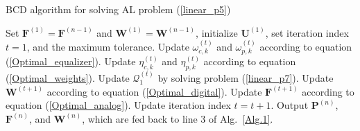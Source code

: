 \documentclass[10pt,journal,twocolumn]{IEEEtran}
\begin{document}
\begin{algorithm}[t]
	\caption{BCD algorithm for solving AL problem (\ref{linear_p5})}
	\begin{algorithmic}[1]\label{Alg.2}
		\STATE Set $\mathbf{F}^{(1)}=\mathbf{F}^{(n-1)}$ and $\mathbf{W}^{(1)}=\mathbf{W}^{(n-1)}$,  initialize $\mathbf{U}^{(1)}$, set iteration index $t=1$,  and the maximum tolerance.
		\STATE Update $\omega^{(t)}_{c,k}$ and $\omega^{(t)}_{p,k}$ according to equation (\ref{Optimal_equalizer}).
        \STATE Update $\eta^{(t)}_{c,k}$ and $\eta^{(t)}_{p,k}$ according to equation (\ref{Optimal_weights}).
        \STATE Update $\mathcal{Q}^{(t)}_1$ by solving problem (\ref{linear_p7}).
        \STATE Update $\mathbf{W}^{(t+1)}$ according to equation (\ref{Optimal_digital}).
        \STATE Update $\mathbf{F}^{(t+1)}$ according to equation (\ref{Optimal_analog}).
		\STATE Update iteration index $t=t+1$.
		\ENDWHILE	
		\STATE Output $\mathbf{P}^{(n)}$, $\mathbf{F}^{(n)}$, and $\mathbf{W}^{(n)}$, which are fed back to line 3 of Alg.~\ref{Alg.1}.
	\end{algorithmic}
\end{algorithm}
\end{document}
